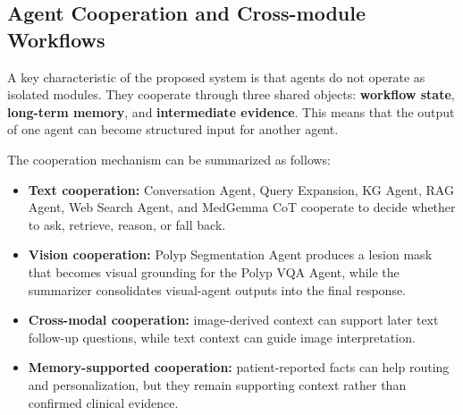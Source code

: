 \subsection{Agent Cooperation and Cross-module Workflows}

A key characteristic of the proposed system is that agents do not operate as isolated modules. They cooperate through three shared objects: \textbf{workflow state}, \textbf{long-term memory}, and \textbf{intermediate evidence}. This means that the output of one agent can become structured input for another agent.

The cooperation mechanism can be summarized as follows:

\begin{itemize}
    \item \textbf{Text cooperation:} Conversation Agent, Query Expansion, KG Agent, RAG Agent, Web Search Agent, and MedGemma CoT cooperate to decide whether to ask, retrieve, reason, or fall back.
    \item \textbf{Vision cooperation:} Polyp Segmentation Agent produces a lesion mask that becomes visual grounding for the Polyp VQA Agent, while the summarizer consolidates visual-agent outputs into the final response.
    \item \textbf{Cross-modal cooperation:} image-derived context can support later text follow-up questions, while text context can guide image interpretation.
    \item \textbf{Memory-supported cooperation:} patient-reported facts can help routing and personalization, but they remain supporting context rather than confirmed clinical evidence.
\end{itemize}

